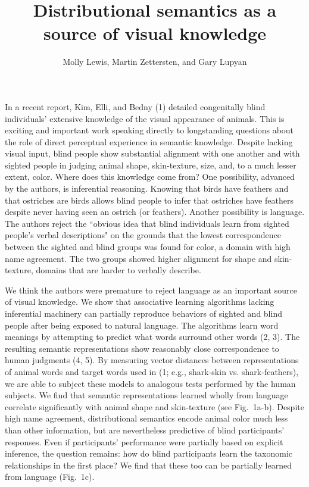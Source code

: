 \documentclass[12pt]{article}
\begin{document}
\title{\normalsize \vspace{-.5\baselineskip} \bf{Distributional semantics as a source of visual knowledge} \vspace{-1.2\baselineskip}}
\author{\small  Molly Lewis, Martin Zettersten, and Gary Lupyan}
\date{}
\clearpage\maketitle
\thispagestyle{empty}
  \small
  


 \vspace{-1\baselineskip}
 
In a recent report, Kim, Elli, and Bedny (1) detailed congenitally blind individuals’ extensive knowledge of the visual appearance of animals. This is exciting and important work speaking directly to longstanding questions about the role of direct perceptual experience in semantic knowledge. Despite lacking visual input, blind people show substantial alignment with one another and with sighted people in judging animal shape, skin-texture, size, and, to a much lesser extent, color. Where does this knowledge come from? One possibility, advanced by the authors, is inferential reasoning. Knowing that birds have feathers and that ostriches are birds allows blind people to infer that ostriches have feathers despite never having seen an ostrich (or feathers). Another possibility is language. The authors reject the ``obvious idea that blind individuals learn from sighted people's verbal descriptions" on the grounds that the lowest correspondence between the sighted and blind groups was found for color, a domain with high name agreement. The two groups showed higher alignment for shape and skin-texture, domains that are harder to verbally describe. 

We think the authors were premature to reject language as an important source of visual knowledge. We show that associative learning algorithms lacking inferential machinery can partially reproduce behaviors of sighted and blind people after being exposed to natural language. The algorithms learn word meanings by attempting to predict what words surround other words (2, 3). The resulting semantic representations show reasonably close correspondence to human judgments  (4, 5). By measuring vector distances between representations of animal words and target words used in (1; e.g., shark-skin vs. shark-feathers), we are able to subject these models to analogous tests performed by the human subjects. We find that semantic representations learned wholly from language correlate significantly with animal shape and skin-texture (see Fig.\ 1a-b). Despite high name agreement, distributional semantics encode animal color much less than other information, but are nevertheless predictive of blind participants' responses. Even if participants’ performance were partially based on explicit inference, the question remains: how do blind participants learn the taxonomic relationships in the first place? We find that these too can be partially learned from language (Fig.\ 1c). 
\end{document}
